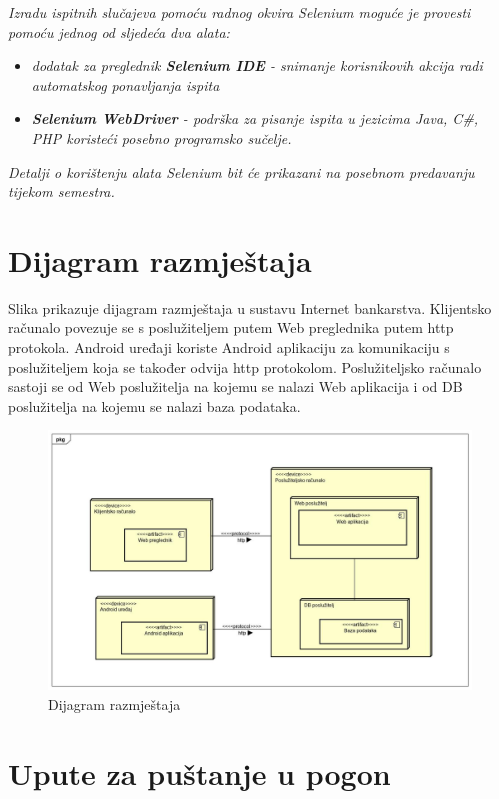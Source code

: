 			 \textit{Izradu ispitnih slučajeva pomoću radnog okvira Selenium moguće je provesti pomoću jednog od sljedeća dva alata:}
			 \begin{itemize}
			 	\item \textit{dodatak za preglednik \textbf{Selenium IDE} - snimanje korisnikovih akcija radi automatskog ponavljanja ispita	}
			 	\item \textit{\textbf{Selenium WebDriver} - podrška za pisanje ispita u jezicima Java, C\#, PHP koristeći posebno programsko sučelje.}
			 \end{itemize}
		 	\textit{Detalji o korištenju alata Selenium bit će prikazani na posebnom predavanju tijekom semestra.}
			
			\eject 
		
		
		\section{Dijagram razmještaja}
			
			Slika prikazuje dijagram razmještaja u sustavu Internet bankarstva. Klijentsko računalo povezuje se s poslužiteljem putem Web preglednika putem http protokola. Android uređaji koriste Android aplikaciju za komunikaciju s poslužiteljem koja se također odvija http protokolom. Poslužiteljsko računalo sastoji se od Web poslužitelja na kojemu se nalazi Web aplikacija i od DB poslužitelja na kojemu se nalazi baza podataka.
			
			\begin{figure}[H]
				\includegraphics[scale=0.3]{Slike/dijagram_razmjestaja.jpg}
				\centering
				\caption{Dijagram razmještaja}
				\label{fig:dijagram}
			\end{figure}
		
		\newpage
		\section{Upute za puštanje u pogon}
		
